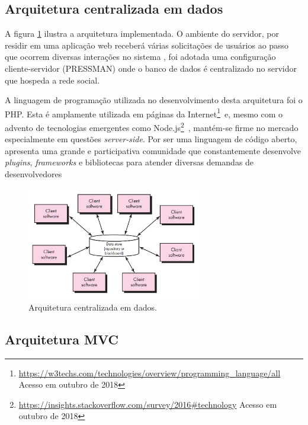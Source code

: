 \documentclass[cic,tc]{iiufrgs}
\begin{document}
\subsection{Arquitetura centralizada em dados}
\label{arquiteturaCentralizadaDados}
A figura \ref{dataCenteredArchitecture} ilustra a arquitetura implementada. O ambiente do servidor, por residir em uma aplicação web receberá várias solicitações de usuários ao passo que ocorrem diversas interações no sistema \cite{kurose}, foi adotada uma configuração cliente-servidor (PRESSMAN) onde o banco de dados é centralizado no servidor que hospeda a rede social.

A linguagem de programação utilizada no desenvolvimento desta arquitetura foi o PHP. Esta é amplamente utilizada em páginas da Internet\footnote{\url{https://w3techs.com/technologies/overview/programming_language/all} Acesso em outubro de 2018}~e, mesmo com o advento de tecnologias emergentes como Node.js\footnote{\url{https://insights.stackoverflow.com/survey/2016\#technology} Acesso em outubro de 2018}~, mantém-se firme no mercado especialmente em questões \textit{server-side}. Por ser uma linguagem de código aberto, apresenta uma grande e participativa comunidade que constantemente desenvolve \textit{plugins}, \textit{frameworks} e bibliotecas para atender diversas demandas de desenvolvedores \cite{phpPatternsArticle2016}

\begin{figure}[ht]
    \caption{Arquitetura centralizada em dados.}
        \begin{center}
            \includegraphics[width=0.68\textwidth]{arquitetura-centralizada-dados.png}
        \end{center}
    \label{dataCenteredArchitecture}
\end{figure}

\subsection{Arquitetura MVC}
\label{arquiteturaMVC}
\end{document}
